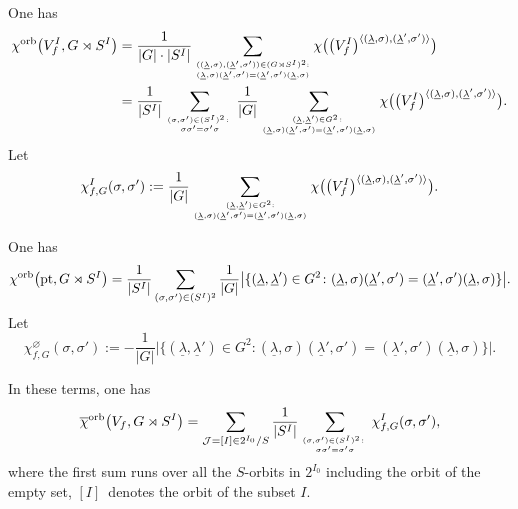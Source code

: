 One has
\begin{align*}
{\chi}^{\rm orb}\big(V_f^I, G\rtimes S^I\big) & =\frac{1}{\vert G\vert\cdot\vert S^I\vert}
 \sum_{{((\underline{\lambda},\sigma),(\underline{\lambda}',\sigma'))\in (G\rtimes S^I)^2:}\atop
 {(\underline{\lambda},\sigma)(\underline{\lambda}',\sigma')=
 (\underline{\lambda}',\sigma')(\underline{\lambda},\sigma)}}
 \chi\big(\big(V_f^I\big)^{\langle(\underline{\lambda},\sigma),(\underline{\lambda}',\sigma')\rangle}\big)\\
 &= \frac{1}{\vert S^I\vert}\sum_{{(\sigma,\sigma')\in (S^I)^2\colon}\atop {\sigma\sigma'=\sigma'\sigma}}
 \frac{1}{\vert G\vert}
 \sum_{{(\underline{\lambda},\underline{\lambda}')\in G^2\colon }\atop
 {(\underline{\lambda},\sigma)(\underline{\lambda}',\sigma')=
 (\underline{\lambda}',\sigma')(\underline{\lambda},\sigma)}}
 \chi\big(\big(V_f^I\big)^{\langle(\underline{\lambda},\sigma),(\underline{\lambda}',\sigma')\rangle}\big).
\end{align*}
Let
\begin{gather}\label{eqn:chi_sigma}
 \chi_{f,G}^I(\sigma,\sigma'):=\frac{1}{\vert G\vert}
 \sum_{{(\underline{\lambda},\underline{\lambda}')\in G^2:}\atop
 {(\underline{\lambda},\sigma)(\underline{\lambda}',\sigma')=
 (\underline{\lambda}',\sigma')(\underline{\lambda},\sigma)}}
 \chi\big(\big(V_f^I\big)^{\langle(\underline{\lambda},\sigma),(\underline{\lambda}',\sigma')\rangle}\big).
\end{gather}

One has
\begin{gather*}
 {\chi}^{\rm orb}\big({\rm pt}, G\rtimes S^I\big) = \frac{1}{\vert S^I\vert}\sum_{(\sigma,\sigma')\in (S^I)^2}
\frac{1}{\vert G\vert}\big\vert\{(\underline{\lambda},\underline{\lambda}')\in G^2\colon
(\underline{\lambda},\sigma)(\underline{\lambda}',\sigma') =(\underline{\lambda}',\sigma')(\underline{\lambda},\sigma)
\}\big\vert.
\end{gather*}
Let
\[
 \chi_{f,G}^{\varnothing}(\sigma,\sigma'):= - \frac{1}{\vert G\vert}\big\vert\{(\underline{\lambda},\underline{\lambda}')
 \in G^2\colon
(\underline{\lambda},\sigma)(\underline{\lambda}',\sigma') =(\underline{\lambda}',\sigma')(\underline{\lambda},\sigma)
\}\big\vert.
\]

In these terms, one has
\begin{gather} \label{eqn:chi_f,G}
{\overline{\chi}}^{ \rm orb}\big(V_f, G\rtimes S^I\big) =
\sum_{{\mathcal J}=[I]\in 2^{I_0}/S} \frac{1}{\vert S^I\vert}
\sum_{{(\sigma,\sigma')\in (S^I)^2\colon }\atop {\sigma\sigma'=\sigma'\sigma}} \chi^I_{f,G}(\sigma, \sigma'),
\end{gather}
where the first sum runs over all the $S$-orbits in $2^{I_0}$ including the orbit of the empty set,
$[I]$~denotes the orbit of the subset $I$.

